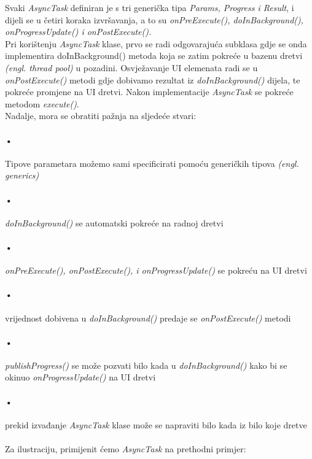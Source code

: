 \documentclass[times, utf8, zavrsni]{fer}
\begin{document}
Svaki \textit{AsyncTask} definiran je s tri generička tipa \textit{Params, Progress i Result}, i dijeli se u četiri koraka izvršavanja, a to su \textit{onPreExecute(), doInBackground(), onProgressUpdate() i onPostExecute().}\\

Pri korištenju \textit{AsyncTask} klase, prvo se radi odgovarajuća subklasa gdje se onda implementira doInBackground() metoda koja se zatim pokreće u bazenu dretvi \textit{(engl. thread pool)} u pozadini. Osvježavanje UI elemenata radi se u \textit{onPostExecute()} metodi gdje dobivamo rezultat iz \textit{doInBackground()} dijela, te pokreće promjene na UI dretvi. Nakon implementacije \textit{AsyncTask} se pokreće metodom \textit{execute()}.\\

Nadalje, mora se obratiti pažnja na sljedeće stvari:
\paragraph{•}
Tipove parametara možemo sami specificirati pomoću generičkih tipova \textit{(engl. generics)}
\paragraph{•}
\textit{doInBackground()} se automatski pokreće na radnoj dretvi
\paragraph{•}
\textit{onPreExecute(), onPostExecute(), i onProgressUpdate()} se pokreću na UI dretvi
\paragraph{•}
vrijednost dobivena u \textit{doInBackground()} predaje se \textit{onPostExecute()} metodi
\paragraph{•}
\textit{publishProgress()} se može pozvati bilo kada u \textit{doInBackground()} kako bi se okinuo \textit{onProgressUpdate()} na UI dretvi
\paragraph{•}
prekid izvađanje \textit{AsyncTask} klase može se napraviti bilo kada iz bilo koje dretve\newpage

\paragraph{}
Za ilustraciju, primijenit ćemo \textit{AsyncTask} na prethodni primjer:
\end{document}
